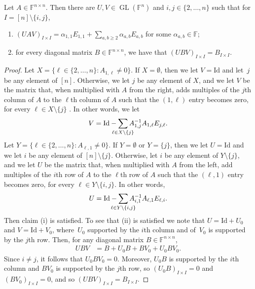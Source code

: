 \documentclass{daj}
\DeclareMathOperator{\Diag}{Diag}
\newcommand{\FF}{\mathbb{F}}
\DeclareMathOperator{\GL}{GL}
\newcommand{\id}{\mathrm{Id}}
\begin{document}
\begin{lemma}\label{lem:diagonalize-ind2}
    Let $A \in \FF^{n \times n}$. Then there are $U,V \in \GL(\FF^n)$ and $i,j \in \{2,\ldots, n\}$ such that for $I = [n] \setminus\{i,j\}$,
    \begin{enumerate}[\upshape (i)]
    \item $(UAV)_{I\times I}  = \alpha_{1,1} E_{1,1} + \sum_{a,b \geq 2} \alpha_{a,b} E_{a,b}$ for some $\alpha_{a,b} \in \FF$;
    \item for every diagonal matrix $B\in \FF^{n\times n}$, we have that $(U B V)_{I\times I} = B_{I\times I}$.
    \end{enumerate}
\end{lemma}
\begin{proof}
    Let $X = \{\ell \in \{2, \ldots, n\} : A_{1, \ell} \neq 0\}$. If $X = \emptyset$, then we let $V = \id$ and let~$j$ be any element of $[n]$. Otherwise, we let $j$ be any element of $X$, and we let $V$ be the matrix that, when multiplied with $A$ from the right, adds multiples of the $j$th column of $A$ to the $\ell$th column of $A$ such that the $(1, \ell)$ entry becomes zero, for every $\ell \in X \setminus \{j\}$%
    . In other words, we let
    \[
    V = \id - \sum_{\mathclap{\ell \in X \setminus \{j\}}} A_{1,j}^{-1} A_{1,\ell} E_{j, \ell}.
    \]
    Let $Y = \{\ell \in \{2, \ldots, n\} : A_{\ell, 1} \neq 0\}$. If $Y= \emptyset$ or $Y = \{j\}$, then we let $U = \id$ and we let $i$ be any element of $[n] \setminus \{j\}$. Otherwise, let $i$ be any element of $Y \setminus \{j\}$, and we let $U$ be the matrix that, when multiplied with $A$ from the left, add multiples of the $i$th row of $A$ to the $\ell$th row of $A$ such that the $(\ell, 1)$ entry becomes zero, for every $\ell \in Y \setminus \{i,j\}$.
    In other words,
    \[
    U = \id - \sum_{\mathclap{\ell \in Y \setminus \{i,j\}}} A_{i,1}^{-1} A_{\ell,1} E_{\ell, i}.
    \]
    Then claim (i) is satisfied. 
    To see that (ii) is satisfied we note that $U = \id + U_0$ and $V = \id + V_0$, where~$U_0$ supported by the $i$th column and of~$V_0$ is supported by the $j$th row.
    Then, for any diagonal matrix $B \in \FF^{n\times n}$,
    \begin{align*}
        UBV &= B + U_0B + BV_0 + U_0BV_0.
    \end{align*}
    Since $i\ne j$, it follows that $U_0BV_0 = 0$.
    Moreover, $U_0B$ is supported by the $i$th column and $BV_0$ is supported by the $j$th row, so $(U_0B)_{I \times I}=0$ and $(BV_0)_{I \times I}=0$, and so $(UBV)_{I \times I} = B_{I\times I}$.
\end{proof}
\end{document}
